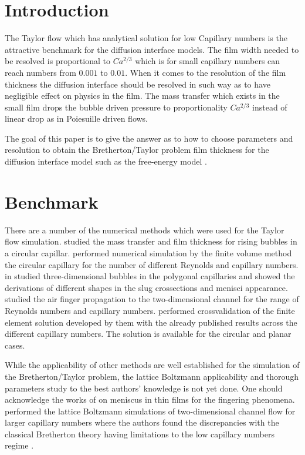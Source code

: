 \documentclass{article}
\begin{document}
\section{Introduction}
The Taylor flow which has analytical solution for low Capillary numbers
\cite{bretherton} is the attractive benchmark for the diffusion interface
models. The film width needed to be resolved is proportional to $Ca^{2/3}$
which is for small capillary numbers can reach numbers from $0.001$ to $0.01$.
When it comes to the resolution of the film thickness the diffusion interface
should be resolved in such way as to have negligible effect on physics in the
film. The mass transfer which exists in the small film drops the bubble driven
pressure to proportionality $Ca^{2/3}$ \cite{kreutzer-pressure-drop} instead of
linear drop as in Poiesuille driven flows.

The goal of this paper is to give the answer as to how to choose parameters and
resolution to obtain the Bretherton/Taylor problem film thickness for the
diffusion interface model such as the free-energy model \cite{swift}. 

\section{Benchmark}

There are a number of the numerical methods which were used for the Taylor flow
simulation. \citet{vanbaten-circular} studied the mass transfer and film
thickness for rising bubbles in a circular capillar.
\citet{kreutzer-pressure-drop} performed numerical simulation by the
finite volume method the circular capillary for the number of different
Reynolds and capillary numbers. \citeauthor{wong-films} in
\cite{wong-films,wong-pressure} studied three-dimensional bubbles in the
polygonal capillaries and showed the derivations of different shapes in the
slug crossections and menisci appearance.
\citet{heil-bretherton,ingham-plates} studied the air finger propagation to
the two-dimensional channel for the range of Reynolds numbers and capillary
numbers. \citet{giavedoni-numerical} performed crossvalidation of the
finite element solution developed by them with the already published results
across the different capillary numbers. The solution is available for the
circular and planar cases. 


While the applicability of other methods are well established for the
simulation of the Bretherton/Taylor problem, the lattice Boltzmann
applicability and thorough parameters study to the best authors' knowledge is
not yet done. One should acknowledge the works of
\citet{pagonabarraga-fingers} on meniscus in thin films for the fingering
phenomena. \citet{sehgal-microchannel} performed the lattice Boltzmann
simulations of two-dimensional channel flow for larger capillary numbers where
the authors found the discrepancies with the classical Bretherton theory having
limitations to the low capillary numbers regime \cite{giavedoni-numerical}. 
\end{document}
